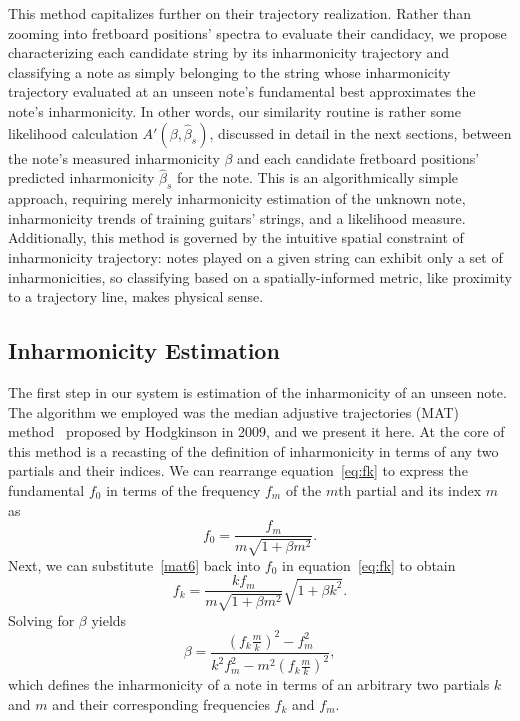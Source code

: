 \documentclass[12pt]{cmuthesis}
\begin{document}
This method capitalizes further on their trajectory realization. Rather than zooming into fretboard positions' spectra to evaluate their candidacy, we propose characterizing each candidate string by its inharmonicity trajectory and classifying a note as simply belonging to the string whose inharmonicity trajectory evaluated at an unseen note's fundamental best approximates the note's inharmonicity. In other words, our similarity routine is rather some likelihood calculation $A'(\beta,\hat{\beta}_s)$, discussed in detail in the next sections, between the note's measured inharmonicity $\beta$ and each candidate fretboard positions' predicted inharmonicity $\hat{\beta}_s$ for the note. This is an algorithmically simple approach, requiring merely inharmonicity estimation of the unknown note, inharmonicity trends of training guitars' strings, and a likelihood measure. Additionally, this method is governed by the intuitive spatial constraint of inharmonicity trajectory: notes played on a given string can exhibit only a set of inharmonicities, so classifying based on a spatially-informed metric, like proximity to a trajectory line, makes physical sense.

\subsection{Inharmonicity Estimation}
\label{mat}
The first step in our system is estimation of the inharmonicity of an unseen note. The algorithm we employed was the median adjustive trajectories (MAT) method~\cite{hodgkinson2009} proposed by Hodgkinson in 2009, and we present it here. At the core of this method is a recasting of the definition of inharmonicity in terms of any two partials and their indices. We can rearrange equation~\eqref{eq:fk} to express the fundamental $f_0$ in terms of the frequency $f_m$ of the $m$th partial and its index $m$ as
\begin{equation}
\label{mat6}
f_0 = \frac{f_m}{m\sqrt{1+\beta m^2}}.
\end{equation}
Next, we can substitute~\eqref{mat6} back into $f_0$ in equation~\eqref{eq:fk} to obtain
\begin{equation}
\label{mat7}
f_k = \frac{kf_m}{m\sqrt{1+\beta m^2}}\sqrt{1+\beta k^2}.
\end{equation}
Solving for $\beta$ yields
\begin{equation}
\label{mat8}
\beta = \frac{(f_k\frac{m}{k})^2-f_m^2}{k^2f_m^2-m^2(f_k\frac{m}{k})^2},
\end{equation}
which defines the inharmonicity of a note in terms of an arbitrary two partials $k$ and $m$ and their corresponding frequencies $f_k$ and $f_m$.
\end{document}
